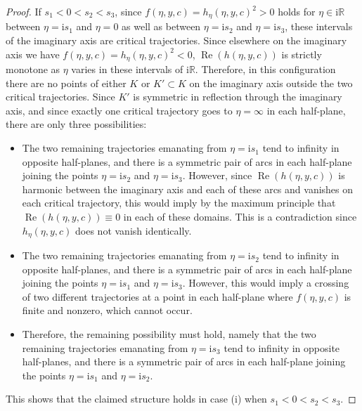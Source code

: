 \documentclass[pdftex]{sigma}
\numberwithin{equation}{section}
\begin{document}
\begin{proof}
If $s_1<0<s_2<s_3$, since $f(\eta,y,c)=h_\eta(\eta,y,c)^2>0$ holds for $\eta\in\mathrm{i}\mathbb{R}$ between $\eta=\mathrm{i} s_1$ and $\eta=0$ as well as between $\eta=\mathrm{i} s_2$ and $\eta=\mathrm{i} s_3$, these intervals of the imaginary axis are critical trajectories. Since elsewhere on the imaginary axis we have ${f(\eta,y,c)=h_\eta(\eta,y,c)^2<0}$, $\operatorname{Re}(h(\eta,y,c))$ is strictly monotone as $\eta$ varies in these intervals of $\mathrm{i}\mathbb{R}$. Therefore, in this configuration there are no points of either $K$ or $K'\subset K$ on the imaginary axis outside the two critical trajectories. Since $K'$ is symmetric in reflection through the imaginary axis, and since exactly one critical trajectory goes to $\eta=\infty$ in each half-plane, there are only three possibilities:
\begin{itemize}\itemsep=0pt
\item The two remaining trajectories emanating from $\eta=\mathrm{i} s_1$ tend to infinity in opposite half-planes, and there is a symmetric pair of arcs in each half-plane joining the points $\eta=\mathrm{i} s_2$ and $\eta=\mathrm{i} s_3$. However, since $\operatorname{Re}(h(\eta,y,c))$ is harmonic between the imaginary axis and each of these arcs and vanishes on each critical trajectory, this would imply by the maximum principle that $\operatorname{Re}(h(\eta,y,c))\equiv 0$ in each of these domains. This is a contradiction since $h_\eta(\eta,y,c)$ does not vanish identically.
\item The two remaining trajectories emanating from $\eta=\mathrm{i} s_2$ tend to infinity in opposite half-planes, and there is a symmetric pair of arcs in each half-plane joining the points $\eta=\mathrm{i} s_1$ and $\eta=\mathrm{i} s_3$. However, this would imply a crossing of two different trajectories at a point in each half-plane where $f(\eta,y,c)$ is finite and nonzero, which cannot occur.
\item Therefore, the remaining possibility must hold, namely that the two remaining trajectories emanating from $\eta=\mathrm{i} s_3$ tend to infinity in opposite half-planes, and there is a symmetric pair of arcs in each half-plane joining the points $\eta=\mathrm{i} s_1$ and $\eta=\mathrm{i} s_2$.
\end{itemize}
This shows that the claimed structure holds in case (i) when $s_1<0<s_2<s_3$.


\end{proof}
\end{document}
